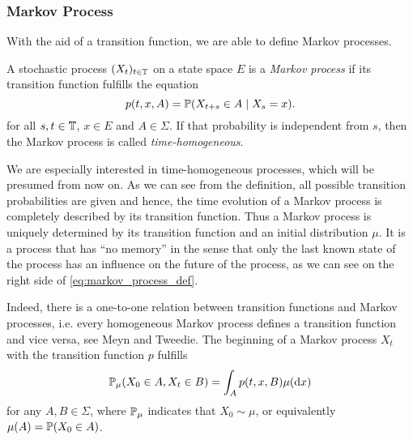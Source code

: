\subsubsection*{Markov Process}
With the aid of a transition function, we are able to define Markov processes.

\begin{defi}
A stochastic process $(X_t)_{t\in\mathbb{T}}$ on a state space $E$ is a \textit{Markov process} if its transition function fulfills the equation
\begin{equation}
\label{eq:markov_process_def}
p(t,x,A) = \mathbb{P} (X_{t+s} \in A \mid X_s =x).
\end{equation}
for all $s,t \in \mathbb{T}$, $x \in E$ and $A \in \Sigma$. If that probability is independent from $s$, then the Markov process is called \textit{time-homogeneous}.
\end{defi}

\clearpage
We are especially interested in time-homogeneous processes, which will be presumed from now on.
As we can see from the definition, all possible transition probabilities are given and hence, the time evolution of a Markov process is completely described by its transition function.
Thus a Markov process is uniquely determined by its transition function and an initial distribution $\mu$.
It is a process that has ``no memory'' in the sense that only the last known state of the process has an influence on the future of the process, as we can see on the right side of \eqref{eq:markov_process_def}.


Indeed, there is a one-to-one relation between transition functions and Markov processes, i.e. every homogeneous Markov process defines a transition function and vice versa, see Meyn and Tweedie\cite[Section 3.4]{meyn1993}.
The beginning of a Markov process $X_t$ with the transition function $p$ fulfills
\begin{equation}
\label{eq:beginning_markov}
\mathbb{P}_\mu (X_0 \in A , X_t \in B) = \int_A p(t,x,B) \mu(\mathop{}\!\mathrm{d} x)
\end{equation}
for any $A,B \in \Sigma$, where $\mathbb{P}_\mu$ indicates that $X_0 \sim \mu$, or equivalently $\mu(A) = \mathbb{P}(X_0 \in A)$.
\\

